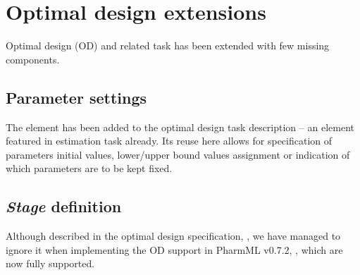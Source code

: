 \section{Optimal design extensions}
\label{sec:OEDextentions}

Optimal design (OD) and related task has been extended with few missing components.

\subsection{Parameter settings}
The element  has been added to the optimal design task description -- 
an element featured in estimation task already. Its reuse here allows for specification 
of parameters initial values, lower/upper bound values assignment or indication of which 
parameters are to be kept fixed.


\subsection{\emph{Stage} definition}
Although described in the optimal design specification, \cite{Commets2015}, 
we have managed to ignore it when implementing the OD support in PharmML v0.7.2,
\cite{Swat:2015b}, which are now fully supported. 

